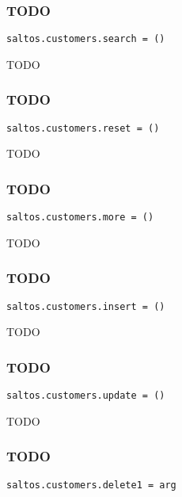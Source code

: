 \documentclass[a4paper]{article}
\begin{document}
\subsubsection{TODO}

\begin{lstlisting}
saltos.customers.search = ()
\end{lstlisting}

TODO

\hypertarget{toc7}{}
\subsubsection{TODO}

\begin{lstlisting}
saltos.customers.reset = ()
\end{lstlisting}

TODO

\hypertarget{toc8}{}
\subsubsection{TODO}

\begin{lstlisting}
saltos.customers.more = ()
\end{lstlisting}

TODO

\hypertarget{toc9}{}
\subsubsection{TODO}

\begin{lstlisting}
saltos.customers.insert = ()
\end{lstlisting}

TODO

\hypertarget{toc10}{}
\subsubsection{TODO}

\begin{lstlisting}
saltos.customers.update = ()
\end{lstlisting}

TODO

\hypertarget{toc11}{}
\subsubsection{TODO}

\begin{lstlisting}
saltos.customers.delete1 = arg
\end{lstlisting}
\end{document}
